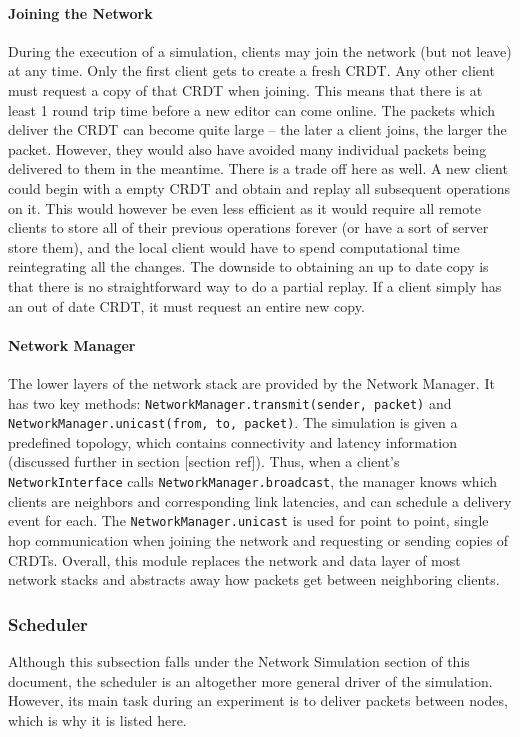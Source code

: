 \documentclass[12pt,a4paper,twoside,openright]{report}
\begin{document}
		\paragraph{Joining the Network}
		During the execution of a simulation, clients may join the network (but not leave) at any time. Only the first client gets to create a fresh CRDT. Any other client must request a copy of that CRDT when joining. This means that there is at least 1 round trip time before a new editor can come online. The packets which deliver the CRDT can become quite large -- the later a client joins, the larger the packet. However, they would also have avoided many individual packets being delivered to them in the meantime. There is a trade off here as well. A new client could begin with a empty CRDT and obtain and replay all subsequent operations on it. This would however be even less efficient as it would require all remote clients to store all of their previous operations forever (or have a sort of server store them), and the local client would have to spend computational time reintegrating all the changes. The downside to obtaining an up to date copy is that there is no straightforward way to do a partial replay. If a client simply has an out of date CRDT, it must request an entire new copy.
		
		
		
		\paragraph{Network Manager}
		The lower layers of the network stack are provided by the Network Manager. It has two key methods: \lstinline|NetworkManager.transmit(sender, packet)| and \lstinline|NetworkManager.unicast(from, to, packet)|. The simulation is given a predefined topology, which contains connectivity and latency information (discussed further in section [section ref]). Thus, when a client's \lstinline|NetworkInterface| calls \lstinline|NetworkManager.broadcast|, the manager knows which clients are neighbors and corresponding link latencies, and can schedule a delivery event for each. The \lstinline|NetworkManager.unicast| is used for point to point, single hop communication when joining the network and requesting or sending copies of CRDTs. Overall, this module replaces the network and data layer of most network stacks and abstracts away how packets get between neighboring clients.
		
		
		\subsubsection{Scheduler}
		Although this subsection falls under the Network Simulation section of this document, the scheduler is an altogether more general driver of the simulation. However, its main task during an experiment is to deliver packets between nodes, which is why it is listed here.
		
\end{document}
